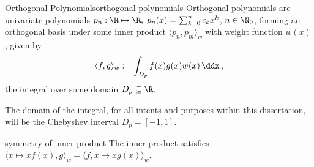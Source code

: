 \begin{definition}{Orthogonal Polynomials}{orthogonal-polynomials}
  Orthogonal polynomials are univariate polynomials
  $p_n: \R \mapsto \R, \; p_n(x) = \sum_{k=0}^{n} c_k x^k$, $n \in \N_0$,
  forming an orthogonal basis under some inner product $\langle p_n, p_m \rangle_w$ with weight function $w(x)$, given by
  $$\langle f, g \rangle_w := \int_{D_p} f(x) g(x) w(x) \,\ddx\,,$$
  the integral over some domain $D_p \subseteq \R$.
\end{definition}

The domain of the integral, for all intents and purposes within this dissertation, will be the Chebyshev interval $D_p = [-1, 1]$.

\begin{remark}{}{symmetry-of-inner-product}
  The inner product satisfies $\langle x\mapsto xf(x), g \rangle_w = \langle f, x \mapsto xg(x)\rangle_w$.
\end{remark}
